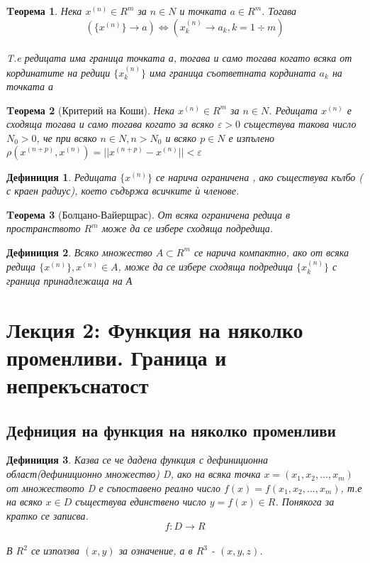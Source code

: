 \documentclass[fleqn]{article}
\newtheorem{theorem}{Tеорема}[subsection]
\newtheorem{definition}{Дефиниция}[subsection]
\begin{document}
\begin{theorem}
Нека $x^{(n)} \in R^m$ за $n \in N$ и точката $a \in R^m$. Тогава 
$$(\{x^{(n)}\} \to a )\iff (x_k ^{(n)} \to a_k, k = 1 \div m)$$\\
T.e редицата има граница точката а, тогава и само тогава когато всяка от кординатите на редици $\{x_k^{(n)}\}$ има граница съответната кордината $a_k$ на точката а
\end{theorem}

\begin{theorem}[Критерий на Коши]
Нека $x^{(n)} \in R^m$ за $n \in N$. Редицата $x^{(n)}$ е сходяща тогава и само тогава когато за всяко $\varepsilon > 0$ съществува такова число $N_0 > 0$, че при всяко $n \in N, n > N_0$ и всяко $p \in N$ е изпълено $\rho(x^{(n+p)}, x^{(n)}) = ||x^{(n+p)} - x^{(n)} || < \varepsilon$
\end{theorem}

\begin{definition}
Редицата $\{x^{(n)}\}$ се нарича ограничена , ако съществува кълбо ( с краен радиус), което съдържа всичките ѝ членове. 
\end{definition}


\begin{theorem}[Болцано-Вайерщрас]
От всяка ограничена редица в пространството $R^m$ може да се избере сходяща подредица. 
\end{theorem}


\begin{definition}
Всяко множество $A \subset R^m $ се нарича компактно, ако от всяка редица $\{x^{(n)}\}, x^{(n)} \in A$, може да се избере сходяща подредица $\{x_k ^{(n)}\}$ с граница принадлежаща на А
\end{definition}

\section{Лекция 2: Функция на няколко променливи. Граница и непрекъснатост}

\subsection{Дефниция на функция на няколко променливи}
	\begin{definition}
Казва се че дадена функция с дефиниционна област(дефиниционно множество) D, ако на всяка точка $x = (x_1, x_2, ... , x_m)$ от множеството D е съпоставено реално число $f(x) = f(x_1, x_2, ... , x_m)$, т.е на всяко $x \in D$ съществува единствено число $y = f(x) \in R$. Понякога за кратко се записва. 
$$f: D \rightarrow R$$\\
В $R^2$ се използва $(x,y)$ за означение, а в $R^3$ - $(x,y,z)$.
	\end{definition}
\end{document}
